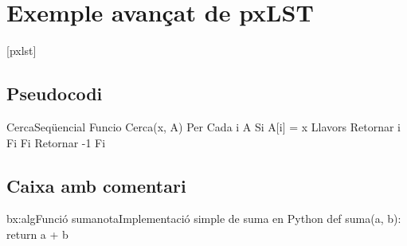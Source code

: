 \documentclass{P3CTeX}
\begin{document}
\section*{Exemple avançat de pxLST}

[pxlst]

\subsection*{Pseudocodi}

\begin{pxCode}[language=algoritme]{CercaSeqüencial}
Funcio Cerca(x, A)
  Per Cada i A
    Si A[i] = x Llavors
      Retornar i
    Fi
  Fi
  Retornar -1
Fi
\end{pxCode}

\subsection*{Caixa amb comentari}

\begin{CodeBox}[language=pxPython]{bx:alg}{Funció suma}{nota}{Implementació simple de suma en Python}
def suma(a, b):
    return a + b
\end{CodeBox}
\end{document}
